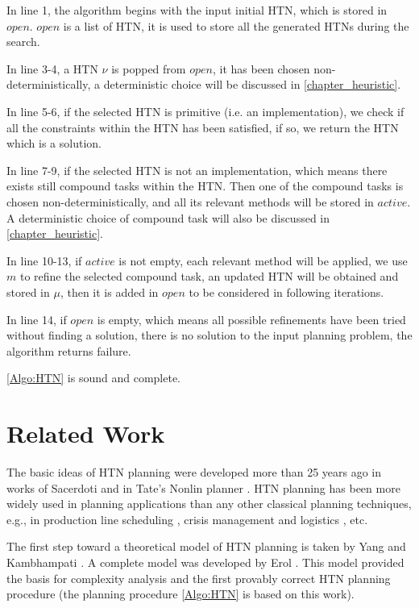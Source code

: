 In line 1, the algorithm begins with the input initial HTN, which is stored in $open$. $open$ is a list of HTN, it is used to store all the generated HTNs during the search.

In line 3-4, a HTN $\nu$ is popped from $open$, it has been chosen non-deterministically, a deterministic choice will be discussed in \autoref{chapter_heuristic}.

In line 5-6, if the selected HTN is primitive (i.e. an implementation), we check if all the constraints within the HTN has been satisfied, if so, we return the HTN which is a solution.

In line 7-9, if the selected HTN is not an implementation, which means there exists still compound tasks within the HTN. Then one of the compound tasks is chosen non-deterministically, and all its relevant methods will be stored in $active$. A deterministic choice of compound task will also be discussed in \autoref{chapter_heuristic}.

In line 10-13, if $active$ is not empty, each relevant method will be applied, we use $m$ to refine the selected compound task, an updated HTN will be obtained and stored in $\mu$, then it is added in $open$ to be considered in following iterations.

In line 14, if $open$ is empty, which means all possible refinements have been tried without finding a solution, there is no solution to the input planning problem, the algorithm returns failure.

\autoref{Algo:HTN} is sound and complete.

\section{Related Work}
The basic ideas of HTN planning were developed more than 25 years ago in works of Sacerdoti \cite[p. 460]{1} and in Tate's Nonlin planner \cite[p. 503]{1}. HTN planning has been more widely used in planning applications than any other classical planning techniques, e.g., in production line scheduling \cite[p. 549]{1}, crisis management and logistics \cite[p. 72]{1} \cite[p. 135]{1}, etc.

The first step toward a theoretical model of HTN planning is taken by Yang \cite[p. 558]{1} and Kambhampati \cite[p. 301]{1}. A complete model was developed by Erol \cite[p. 174]{1}. This model provided the basis for complexity analysis \cite[p. 175]{1} and the first provably correct HTN planning procedure (the planning procedure \ref{Algo:HTN} is based on this work). 

